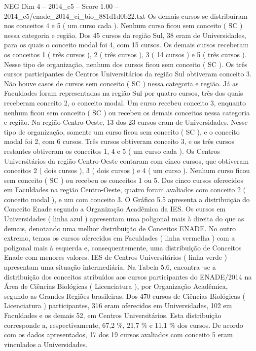 \begin{textsample}{NEG Dim 4 – 2014\_c5 – Score 1.00 – 2014\_c5/enade\_2014\_ci\_bio\_881d1d0b22.txt}
Os demais cursos se distribuíram nos conceitos 4 e 5 ( um curso cada ).
Nenhum curso ficou sem conceito ( SC ) nessa categoria e região.
Dos 45 cursos da região Sul, 38 eram de Universidades, para os quais o conceito modal foi 4, com 15 cursos.
Os demais cursos receberam os conceitos 1 ( três cursos ), 2 ( três cursos ), 3 ( 14 cursos ) e 5 ( três cursos ).
Nesse tipo de organização, nenhum dos cursos ficou sem conceito ( SC ).
Os três cursos participantes de Centros Universitários da região Sul obtiveram conceito 3.
Não houve casos de cursos sem conceito ( SC ) nessa categoria e região.
Já as Faculdades foram representadas na região Sul por quatro cursos, três dos quais receberam conceito 2, o conceito modal.
Um curso recebeu conceito 3, enquanto nenhum ficou sem conceito ( SC ) ou recebeu os demais conceitos nessa categoria e região.
Na região Centro-Oeste, 13 dos 23 cursos eram de Universidades.
Nesse tipo de organização, somente um curso ficou sem conceito ( SC ), e o conceito modal foi 2, com 6 cursos.
Três cursos obtiveram conceito 3, e os três cursos restantes obtiveram os conceitos 1, 4 e 5 ( um curso cada ).
Os Centros Universitários da região Centro-Oeste contaram com cinco cursos, que obtiveram conceitos 2 ( dois cursos ), 3 ( dois cursos ) e 4 ( um curso ).
Nenhum curso ficou sem conceito ( SC ) ou recebeu os conceitos 1 ou 5.
Dos cinco cursos oferecidos em Faculdades na região Centro-Oeste, quatro foram avaliados com conceito 2 ( conceito modal ), e um com conceito 3.
O Gráfico 5.5 apresenta a distribuição do Conceito Enade segundo a Organização Acadêmica da IES.
Os cursos em Universidades ( linha azul ) apresentam uma poligonal mais à direita do que as demais, denotando uma melhor distribuição de Conceitos ENADE.
No outro extremo, temos os cursos oferecidos em Faculdades ( linha vermelha ) com a poligonal mais à esquerda e, consequentemente, uma distribuição de Conceitos Enade com menores valores.
IES de Centros Universitários ( linha verde ) apresentam uma situação intermediária.
Na Tabela 5.6, encontra -se a distribuição dos conceitos atribuídos aos cursos participantes do ENADE/2014 na Área de Ciências Biológicas ( Licenciatura ), por Organização Acadêmica, segundo as Grandes Regiões brasileiras.
Dos 470 cursos de Ciências Biológicas ( Licenciatura ) participantes, 316 eram oferecidos em Universidades, 102 em Faculdades e os demais 52, em Centros Universitários.
Esta distribuição corresponde a, respectivamente, 67,2 \%, 21,7 \% e 11,1 \% dos cursos.
De acordo com os dados apresentados, 17 dos 19 cursos avaliados com conceito 5 eram vinculados a Universidades.

\end{textsample}
